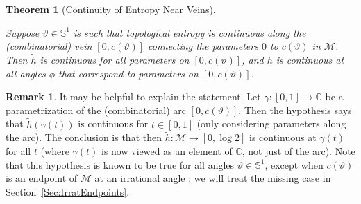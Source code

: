 \documentclass[12pt]{amsart}
\newcommand{\M}{\mathscr M}
\newcommand{\C}{\mathbb C}
\newcommand{\Circle}{\mathbb S^1}
\newcommand{\0}{\texttt{0}}
\newcommand{\1}{\texttt{1}}
\newtheorem{theorem}{Theorem}[section]
\theoremstyle{definition}
\newtheorem*{remark}{Remark}
\numberwithin{equation}{section}
\renewcommand{\theta}{\vartheta}
\newcommand{\lineclear}{\rule{0pt}{2pt}\newline}
\begin{document}
\begin{theorem}[Continuity of Entropy Near Veins]
\label{Thm:ContinuityNearVeins} \lineclear
Suppose $\theta\in\Circle$ is such that topological entropy is continuous along the (combinatorial) vein $[0,c(\theta)]$ connecting the parameters $0$ to $c(\theta)$ in $\M$. Then $\tilde h$ is continuous for all parameters on $[0,c(\theta)]$, and $h$ is continuous at all angles $\phi$ that correspond to parameters on $[0,c(\theta)]$.
\end{theorem}

\begin{remark}
It may be helpful to explain the statement. Let $\gamma\colon[0,1]\to \C$ be a parametrization of the (combinatorial) arc $[0,c(\theta)]$. Then the hypothesis says that $\tilde h(\gamma(t))$ is continuous for $t\in[0,1]$ (only considering parameters along the arc). The conclusion is that then $\tilde h\colon\M\to[0,\log 2]$ is continuous at $\gamma(t)$ for all $t$ (where $\gamma(t)$ is now viewed as an element of $\C$, not just of the arc). Note that this hypothesis is known to be true for all angles $\theta\in\Circle$, except when $c(\theta)$ is an endpoint of $\M$ at an irrational angle \cite[Theorem~4.9]{Jung}; we will treat the missing case in Section~\ref{Sec:IrratEndpoints}. 
\end{remark}
\end{document}
